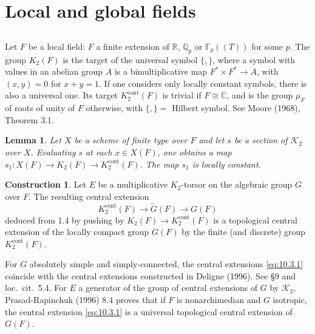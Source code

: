 \documentclass[11pt,a4paper]{article}
\theoremstyle{plain}
\newtheorem{lemma}[theorem]{Lemma}
\theoremstyle{definition}
\newtheorem{construction}[theorem]{Construction}
\DeclareMathOperator{\cont}{cont}
\newcommand{\cK}{\mathcal{K}}
\newcommand{\bQ}{\mathbb{Q}}
\newcommand{\bR}{\mathbb{R}}
\newcommand{\bC}{\mathbb{C}}
\newcommand{\bF}{\mathbb{F}}
\begin{document}
\section{Local and global fields}

\subsection{}
Let $F$ be a local field: $F$ a finite extension of $\bR$, $\bQ_p$ or $\bF_p((T))$ for some $p$. The group $K_2(F)$ is the target of the universal symbol $\{,\}$, where a symbol with values in an abelian group $A$ is a bimultiplicative map $F^* \times F^* \to A$, with $(x,y) = 0$ for $x+y=1$. If one considers only locally constant symbols, there is also a universal one. Its target $K_2^{\cont}(F)$ is trivial if $F \cong \bC$, and is the group $\mu_F$ of roots of unity of $F$ otherwise, with $\{,\} = $ Hilbert symbol. See Moore (1968), Theorem 3.1.

\begin{lemma}\label{lem:10.2}
Let $X$ be a scheme of finite type over $F$ and let $s$ be a section of $\cK_2$ over $X$. Evaluating $s$ at each $x \in X(F)$, one obtains a map $s_1: X(F) \to K_2(F) \to K_2^{\cont}(F)$. The map $s_1$ is locally constant.
\end{lemma}

\begin{construction}\label{constr:10.3}
Let $E$ be a multiplicative $K_2$-torsor on the algebraic group $G$ over $F$. The resulting central extension
\begin{equation}\label{eq:10.3.1}
K_2^{\cont}(F) \to \widetilde{G}(F) \to G(F)
\end{equation}
deduced from 1.4 by pushing by $K_2(F) \to K_2^{\cont}(F)$ is a topological central extension of the locally compact group $G(F)$ by the finite (and discrete) group $K_2^{\cont}(F)$.
\end{construction}

For $G$ absolutely simple and simply-connected, the central extensions \eqref{eq:10.3.1} coincide with the central extensions constructed in Deligne (1996). See \S 9 and loc.~cit.~5.4. For $E$ a generator of the group of central extensions of $G$ by $\cK_2$, Prasad-Rapinchuk (1996) 8.4 proves that if $F$ is nonarchimedian and $G$ isotropic, the central extension \eqref{eq:10.3.1} is a universal topological central extension of $G(F)$.
\end{document}
